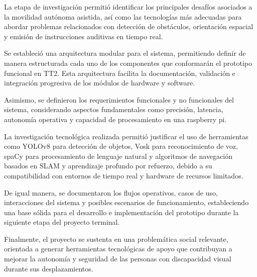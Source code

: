 La etapa de investigación permitió identificar los principales desafíos asociados a la movilidad autónoma asistida, así como las tecnologías más adecuadas para abordar problemas relacionados con detección de obstáculos, orientación espacial y emisión de instrucciones auditivas en tiempo real.

Se estableció una arquitectura modular para el sistema, permitiendo definir de manera estructurada cada uno de los componentes que conformarán el prototipo funcional en TT2. Esta arquitectura facilita la documentación, validación e integración progresiva de los módulos de hardware y software.

Asimismo, se definieron los requerimientos funcionales y no funcionales del sistema, considerando aspectos fundamentales como precisión, latencia, autonomía operativa y capacidad de procesamiento en una raspberry pi.

La investigación tecnológica realizada permitió justificar el uso de herramientas como YOLOv8 para detección de objetos, Vosk para reconocimiento de voz, spaCy para procesamiento de lenguaje natural y algoritmos de navegación basados en SLAM y aprendizaje profundo por refuerzo, debido a su compatibilidad con entornos de tiempo real y hardware de recursos limitados.

De igual manera, se documentaron los flujos operativos, casos de uso, interacciones del sistema y posibles escenarios de funcionamiento, estableciendo una base sólida para el desarrollo e implementación del prototipo durante la siguiente etapa del proyecto terminal.

Finalmente, el proyecto se sustenta en una problemática social relevante, orientada a generar herramientas tecnológicas de apoyo que contribuyan a mejorar la autonomía y seguridad de las personas con discapacidad visual durante sus desplazamientos.